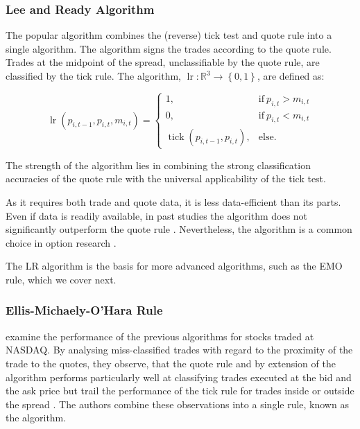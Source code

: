 \subsubsection{Lee and Ready Algorithm}\label{sec:lee-and-ready-algorithm}

The popular  algorithm \autocite[][745]{leeInferringTradeDirection1991} combines the (reverse) tick test and quote rule into a single algorithm. The algorithm signs the trades according to the quote rule. Trades at the midpoint of the spread, unclassifiable by the quote rule, are classified by the tick rule. The  algorithm, $\operatorname{lr} \colon \mathbb{R}^3 \to \left\{0,1\right\}$, are defined as:

\begin{equation}
  \operatorname{lr}(p_{i,t-1}, p_{i,t}, m_{i,t})=
  \begin{cases}
    1,                                       & \text{if}\ p_{i, t} > m_{i, t} \\
    0,                                       & \text{if}\ p_{i, t} < m_{i, t} \\
    \operatorname{tick}(p_{i,t-1}, p_{i,t}), & \text{else}.
  \end{cases}
\end{equation}

The strength of the algorithm lies in combining the strong classification accuracies of the quote rule with the universal applicability of the tick test.

As it requires both trade and quote data, it is less data-efficient than its parts. Even if data is readily available, in past studies the algorithm does not significantly outperform the quote rule \autocites[][30--32]{grauerOptionTradeClassification2022}[][886]{savickasInferringDirectionOption2003}.  Nevertheless, the algorithm is a common choice in option research \autocite[cp.][453]{easleyOptionVolumeStock1998}.

The \gls{LR} algorithm is the basis for more advanced algorithms, such as the \gls{EMO} rule, which we cover next.

\subsubsection{Ellis-Michaely-O'Hara
  Rule}\label{sec:ellis-michaely-ohara-rule}

\textcite[][536]{ellisAccuracyTradeClassification2000} examine the performance of the previous algorithms for stocks traded at \gls{NASDAQ}. By analysing miss-classified trades with regard to the proximity of the trade to the quotes, they observe, that the quote rule and by extension of the  algorithm performs particularly well at classifying trades executed at the bid and the ask price but trail the performance of the tick rule for trades inside or outside the spread \autocite[][535--536]{ellisAccuracyTradeClassification2000}. The authors combine these observations into a single rule, known as the  algorithm.

